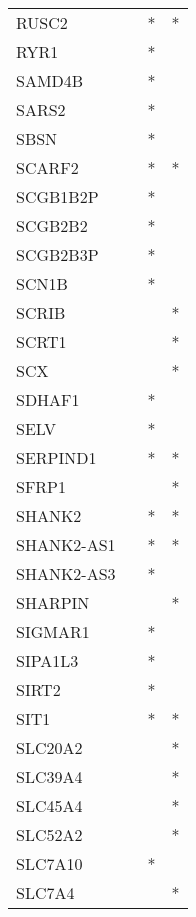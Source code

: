 \begin{longtable}{lccc}
RUSC2        &           &   * &       * \\
RYR1         &           &   * &         \\
SAMD4B       &           &   * &         \\
SARS2        &           &   * &         \\
SBSN         &           &   * &         \\
SCARF2       &           &   * &       * \\
SCGB1B2P     &           &   * &         \\
SCGB2B2      &           &   * &         \\
SCGB2B3P     &           &   * &         \\
SCN1B        &           &   * &         \\
SCRIB        &           &     &       * \\
SCRT1        &           &     &       * \\
SCX          &           &     &       * \\
SDHAF1       &           &   * &         \\
SELV         &           &   * &         \\
SERPIND1     &           &   * &       * \\
SFRP1        &           &     &       * \\
SHANK2       &           &   * &       * \\
SHANK2-AS1   &           &   * &       * \\
SHANK2-AS3   &           &   * &         \\
SHARPIN      &           &     &       * \\
SIGMAR1      &           &   * &         \\
SIPA1L3      &           &   * &         \\
SIRT2        &           &   * &         \\
SIT1         &           &   * &       * \\
SLC20A2      &           &     &       * \\
SLC39A4      &           &     &       * \\
SLC45A4      &           &     &       * \\
SLC52A2      &           &     &       * \\
SLC7A10      &           &   * &         \\
SLC7A4       &           &     &       * \\

\end{longtable}
